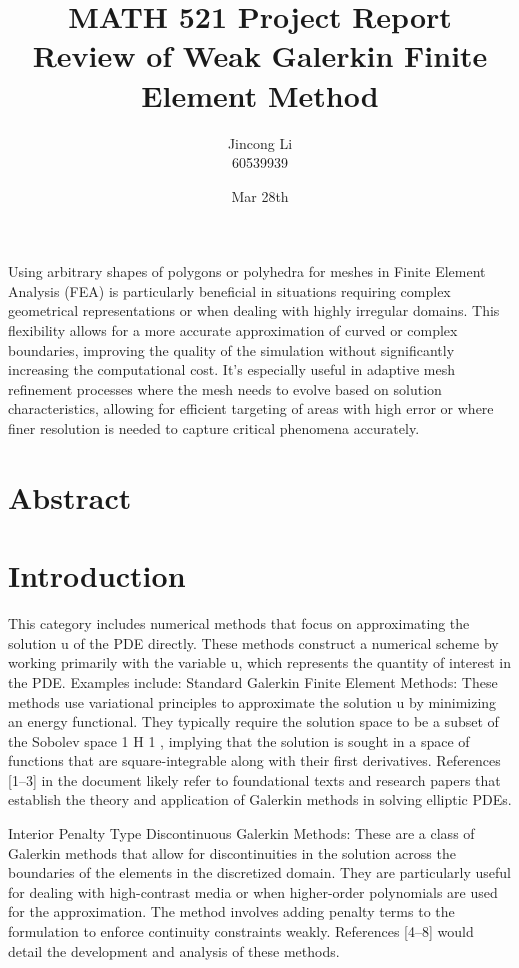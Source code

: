 \documentclass[a4paper,11pt]{article} %
\begin{document}
\setlength{\parskip}{1em} 
\setlength{\parindent}{0pt}
\newcommand{\vect}[1]{\mathbf{#1}}

\title{MATH 521 Project Report \\
Review of Weak Galerkin Finite Element Method}
\author{Jincong Li \\ 60539939}
\date{Mar 28th}
\maketitle

Using arbitrary shapes of polygons or polyhedra for meshes in Finite Element Analysis (FEA) 
is particularly beneficial in situations requiring complex geometrical representations or 
when dealing with highly irregular domains. This flexibility allows for a more accurate 
approximation of curved or complex boundaries, improving the quality of the simulation 
without significantly increasing the computational cost. It's especially useful in adaptive 
mesh refinement processes where the mesh needs to evolve based on solution characteristics, 
allowing for efficient targeting of areas with high error or where finer resolution is 
needed to capture critical phenomena accurately.
\section*{Abstract}

\section*{Introduction}
This category includes numerical methods that focus on approximating the solution u of the PDE directly. 
These methods construct a numerical scheme by working primarily with the variable 
u, which represents the quantity of interest in the PDE. Examples include:
Standard Galerkin Finite Element Methods: These methods use variational principles to approximate the solution 
u by minimizing an energy functional. They typically require the solution space to be a subset of the Sobolev space 
1 H 1
, implying that the solution is sought in a space of functions that are square-integrable along with their 
first derivatives. References [1–3] in the document likely refer to foundational texts and research papers 
that establish the theory and application of Galerkin methods in solving elliptic PDEs.

Interior Penalty Type Discontinuous Galerkin Methods: These are a class of Galerkin methods that allow 
for discontinuities in the solution across the boundaries of the elements in the discretized domain. 
They are particularly useful for dealing with high-contrast media or when higher-order polynomials 
are used for the approximation. The method involves adding penalty terms to the formulation to 
enforce continuity constraints weakly. References [4–8] would detail the development and analysis of these methods.
\end{document}
